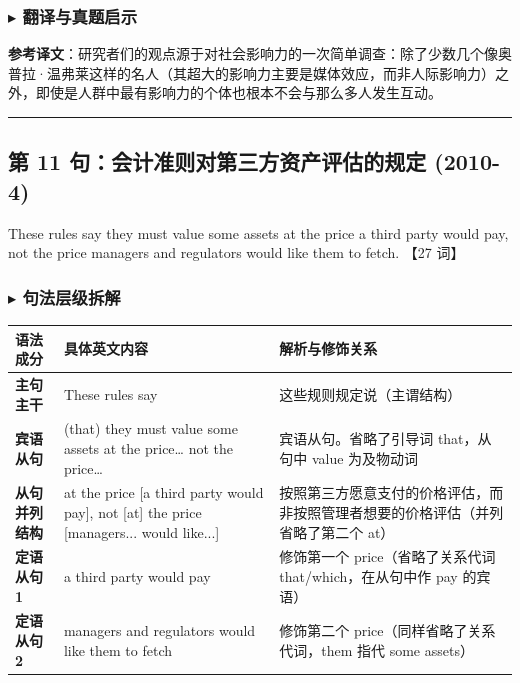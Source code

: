 \documentclass[cn,normal,11pt]{elegantnote}
\begin{document}
\subsubsection*{$\blacktriangleright$ 翻译与真题启示}
\begin{remark}
  \textbf{参考译文}：研究者们的观点源于对社会影响力的一次简单调查：除了少数几个像奥普拉·温弗莱这样的名人（其超大的影响力主要是媒体效应，而非人际影响力）之外，即使是人群中最有影响力的个体也根本不会与那么多人发生互动。
\end{remark}

\par\vspace{10pt}\hrule\vspace{10pt}

\subsection{第 11 句：会计准则对第三方资产评估的规定 (2010-4)}

\begin{note}
  These rules say they must value some assets at the price a third party would pay, not the price managers and regulators would like them to fetch. 【27 词】
\end{note}

\subsubsection*{$\blacktriangleright$ 句法层级拆解}
\noindent
\begin{tabularx}{\textwidth}{p{3.2cm} X X}
  \toprule
  \textbf{语法成分} & \textbf{具体英文内容} & \textbf{解析与修饰关系} \\
  \midrule
  \textbf{主句主干} & These rules say & 这些规则规定说（主谓结构） \\
  \midrule
  \textbf{宾语从句} & (that) they must value some assets at the price… not the price… & 宾语从句。省略了引导词 that，从句中 value 为及物动词 \\
  \midrule
  \textbf{从句并列结构} & at the price [a third party would pay], not [at] the price [managers... would like...] & 按照第三方愿意支付的价格评估，而非按照管理者想要的价格评估（并列省略了第二个 at） \\
  \midrule
  \textbf{定语从句 1} & a third party would pay & 修饰第一个 price（省略了关系代词 that/which，在从句中作 pay 的宾语） \\
  \midrule
  \textbf{定语从句 2} & managers and regulators would like them to fetch & 修饰第二个 price（同样省略了关系代词，them 指代 some assets） \\
  \bottomrule
\end{tabularx}
\end{document}
